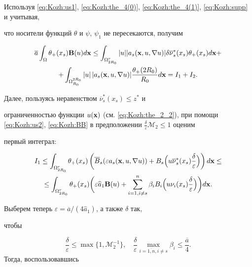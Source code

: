 Используя \eqref{eq:Kozh:us1}, \eqref{eq:Kozh:the_4(0)}, \eqref {eq:Kozh:the_4(1)}, \eqref{eq:Kozh:supp} и учитывая,

что носители функций $\theta$ и $\psi$, $\psi_1$  не пересекаются, получим

\begin{multline}\label{eq:Kozh:the_4(3)}

  \overline{a}\int_{\Omega}\theta_+(x_s)\mathbf{B}(u)d{\bf x}

    \leq \int_{\Omega_{2R_0}^r} |u| |a_{s}({\bf x},u,\nabla u)| \delta

  \overline{\nu}_s^*(x_s)\theta_+(x_s)d{\bf x}+

\\

+\int_{\Omega_{R_0}^{2R_0}}|u| \, |a_{s}({\bf x},u,\nabla

  u)|\frac{\theta_+(2R_0)}{R_0}d{\bf x}=I_1+I_2.

\end{multline}

 Далее, пользуясь неравенством $\overline{\nu}_s^*(x_s)\leq z^*$ и

ограниченностью функции  $u({\bf x})$ (см. \eqref{eq:Kozh:the_2_2}), при помощи \eqref{eq:Kozh:us2}, \eqref{eq:Kozh:BB} в предположении  $\frac{\delta}{\varepsilon} \mathcal{M}_2\leq 1$ оценим

первый интеграл:

\begin{multline*}

  I_1 \leq \int_{\Omega_{2R_0}^r}

  \theta_+(x_s)\left(\overline{B}_s(\varepsilon a_{s}({\bf x},u,\nabla

  u))+B_s\Bigl(u\overline{\nu}_s^*(x_s)\frac{\delta}{\varepsilon}\Bigr)\right)d{\bf x}\leq

\\

  \leq \int_{\Omega_{2R_0}^r} \theta_+(x_s)\biggl(\varepsilon \widehat{a}_1\mathbf{B}(u)+\sum\limits_{i=1,i\neq s}^n \beta_i B_i\Bigl(u{\nu}_i(x_s)\frac{\delta}{\varepsilon}\Bigr)\biggr)d{\bf x}.

\end{multline*}

Выберем теперь $\varepsilon={\overline{a}}/({4\widehat{a}_1})$, а также $\delta$ так,

чтобы

$$\frac{\delta}{\varepsilon}\leq \max\{1,\mathcal{M}^{-1}_2\}, \quad \frac{\delta}{\varepsilon}\max \limits_{i=\overline{1,n},i\neq s}\beta_i\leq \frac{\overline{a}}{4}.$$ Тогда, воспользовавшись

